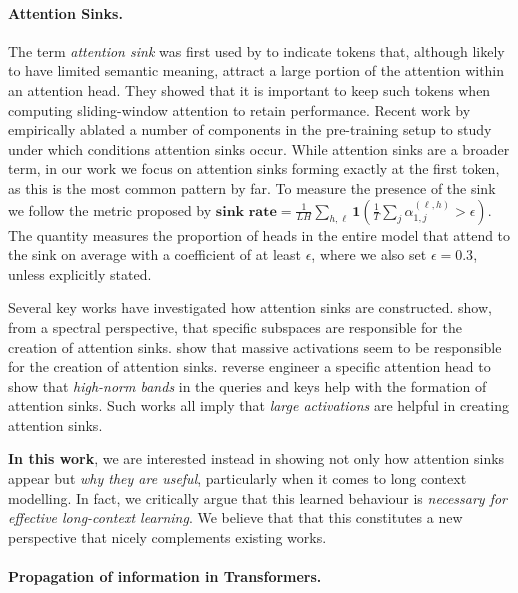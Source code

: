 \documentclass{article} %
\begin{document}
\paragraph{Attention Sinks.} The term \emph{attention sink} was first used by \citet{xiao2024efficient} to indicate tokens that, although likely to have limited semantic meaning, attract a large portion of the attention within an attention head. They showed that it is important to keep such tokens when computing sliding-window attention to retain performance. Recent work by \cite{gu2025when} empirically ablated a number of components in the pre-training setup to study under which conditions attention sinks occur. While attention sinks are a broader term, in our work we focus on attention sinks forming exactly at the first token, as this is the most common pattern by far. To measure the presence of the sink we follow the metric proposed by \cite{gu2025when} $\textbf{sink rate} = \frac{1}{L H} \sum_{h, \ell} \mathbf{1}\left(\frac{1}{T}\sum_j \alpha_{1, j}^{(\ell, h)} > \epsilon \right)$. The quantity measures the proportion of heads in the entire model that attend to the sink on average with a coefficient of at least $\epsilon$, where we also set $\epsilon = 0.3$, unless explicitly stated.

Several key works have investigated how attention sinks are constructed. \cite{cancedda2024spectral} show, from a spectral perspective, that specific subspaces are responsible for the creation of attention sinks. \cite{sun2024massive} show that massive activations seem to be responsible for the creation of attention sinks. \cite{barbero2025round} reverse engineer a specific attention head to show that \emph{high-norm bands} in the queries and keys help with the formation of attention sinks. Such works all imply that \emph{large activations} are helpful in creating attention sinks.

\textbf{In this work}, we are interested instead in showing not only how attention sinks appear but \emph{why they are useful}, particularly when it comes to long context modelling. In fact, we critically argue that this learned behaviour is \emph{necessary for effective long-context learning}. We believe that that this constitutes a new perspective that nicely complements existing works.
 
\paragraph{Propagation of information in Transformers.}
\end{document}
